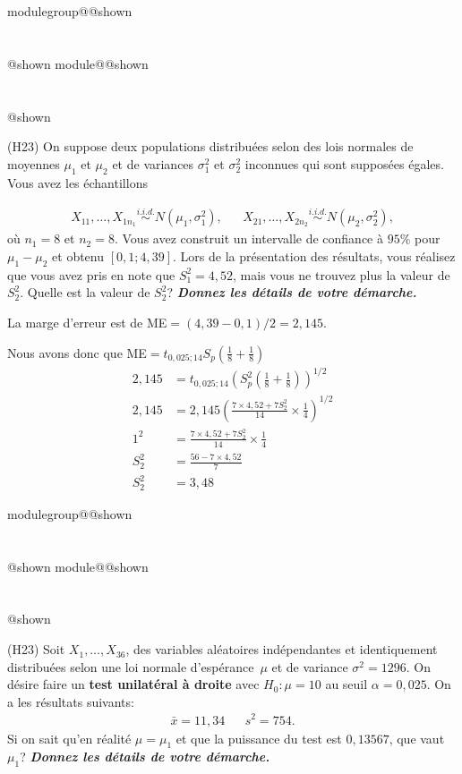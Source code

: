 \documentclass{Evaluation}
\makeatletter
\newcommand{\currentmodulekey}{}
\newcommand{\currentmoduletitle}{}
\newcommand{\currentgroupkey}{}
\newcommand{\currentgrouptitle}{}
\newcommand{\showmoduleifneeded}{%
  \ifx\currentgroupkey\empty\else
    \expandafter\ifx\csname modulegroup@\currentgroupkey @shown\endcsname\relax
      \section*{\currentgrouptitle}%
      \expandafter\gdef\csname modulegroup@\currentgroupkey @shown\endcsname{1}%
    \fi
  \fi
  \expandafter\ifx\csname module@\currentmodulekey @shown\endcsname\relax
    \section*{\currentmoduletitle}%
    \expandafter\gdef\csname module@\currentmodulekey @shown\endcsname{1}%
  \fi
}
\newenvironment{H23}{\showmoduleifneeded}{}
\makeatother
\begin{document}
\begin{questions}
\begin{H23}
\question
(H23)
On suppose deux populations distribuées selon des lois normales de moyennes $\mu_1$ et $\mu_2$ et de variances $\sigma^2_1$ et $\sigma^2_2$ inconnues qui sont supposées égales. Vous avez les échantillons

\begin{align*}
X_{11}, \ldots, X_{1n_1} \overset{i.i.d.}{\sim} N(\mu_1, \sigma^2_1), & & X_{21}, \ldots, X_{2n_2} \overset{i.i.d.}{\sim} N(\mu_2, \sigma^2_2),
\end{align*}
où $n_1=8$ et $n_2=8$. Vous avez construit un intervalle de confiance à $95\%$ pour $\mu_1-\mu_2$ et obtenu $[0,1; 4,39]$. Lors de la présentation des résultats, vous réalisez que vous avez pris en note que $S^2_1=4,52$, mais vous ne trouvez plus la valeur de $S^2_2$. Quelle est la valeur de $S^2_2$? \textit{\textbf{Donnez les détails de votre démarche.}}

\begin{solution}
    La marge d'erreur est de ME$=(4,39-0,1)/2=2,145$.

    Nous avons donc que ME$=t_{0,025;14}S_p(\frac{1}{8}+\frac{1}{8})$
    \begin{align*}
        2,145&=t_{0,025;14}\left(S_p^2\left(\frac{1}{8}+\frac{1}{8}\right)\right)^{1/2}\\
        2,145&=2,145 \left(\frac{7\times4,52+7 S_2^2}{14} \times \frac{1}{4}\right)^{1/2}\\
        1^2 &= \frac{7\times4,52+7 S_2^2}{14} \times \frac{1}{4}\\
        S_2^2&=\frac{56-7\times 4,52}{7}\\
        S_2^2&=3,48
    \end{align*}
\end{solution}
\end{H23}

\begin{H23}
\question
(H23) Soit $X_1,\hdots, X_{36}$, des variables aléatoires indépendantes et identiquement distribuées selon une loi normale d'espérance~$\mu$ et de variance $\sigma^2=1296$.
On désire faire un \textbf{test unilatéral à droite} avec $H_0:\mu=10$ au seuil $\alpha = 0,025$.
On a les résultats suivants:
\begin{align*}
    \bar{x}= 11,34 &  & s^2=754.
\end{align*}
Si on sait qu'en réalité $\mu=\mu_1$ et que la puissance du test est $0,13567$, que vaut $\mu_1$? \textbf{\textit{Donnez les détails de votre démarche.}}


\end{H23}
\end{questions}
\end{document}
